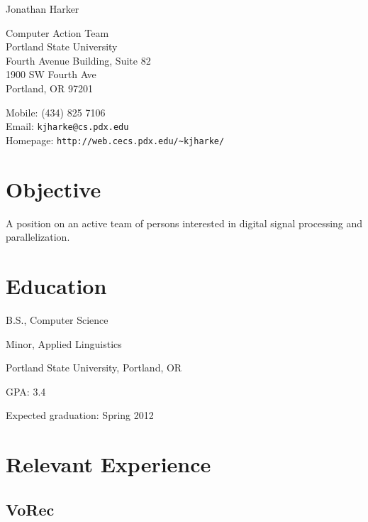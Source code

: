 \documentclass[10pt,letterpaper]{article}
\def\name{Jonathan Harker}
\renewenvironment{itemize}{
  \begin{list}{}{
    \setlength{\leftmargin}{1.5em}
    \setlength{\itemsep}{0em}
    \setlength{\parskip}{0pt}
    \setlength{\parsep}{0em}
  }
}{
  \end{list}
}
\begin{document}
{\huge \name}


\vspace{0.25in}

\begin{minipage}[t]{0.5\textwidth}
  Computer Action Team \\
  Portland State University \\
  Fourth Avenue Building, Suite 82 \\
  1900 SW Fourth Ave \\
  Portland, OR 97201
\end{minipage}
\begin{minipage}[t]{0.5\textwidth}
  Mobile: (434) 825 7106\\
  Email: \texttt{kjharke@cs.pdx.edu} \\
  Homepage: \texttt{http://web.cecs.pdx.edu/\textasciitilde kjharke/} \\
\end{minipage}

\section*{Objective}

A position on an active team of persons interested in digital signal processing and parallelization.

\section*{Education}

\begin{itemize}

  \item B.S., Computer Science
  \item Minor, Applied Linguistics
  \item Portland State University, Portland, OR
  \item GPA: 3.4
  \item Expected graduation: Spring 2012
  
\end{itemize}

\section*{Relevant Experience}

\subsection*{VoRec}
\end{document}

